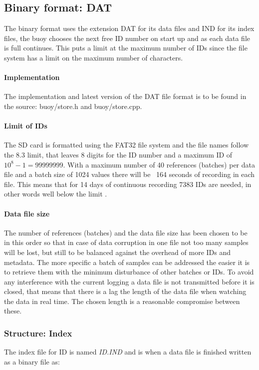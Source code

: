 \documentclass[a4paper]{article}
\begin{document}
\begin{multicols}{2}
  \subsection{Binary format: DAT}
  The binary format uses the extension DAT for its data files and IND
  for its index files, the buoy chooses the next free ID number on start
  up and as each data file is full continues. This puts a limit at the
  maximum number of IDs since the file system has a limit on the maximum
  number of characters.

  \paragraph{Implementation}
  The implementation and latest version of the DAT file format is to be
  found in the source: buoy/store.h and buoy/store.cpp.

  \paragraph{Limit of IDs}
  The SD card is formatted using the FAT32 file system and the file
  names follow the 8.3 limit, that leaves 8 digits for the ID number and
  a maximum ID of $10^8 - 1 = 99999999$. With a maximum number of 40 references
  (batches) per data file and a batch size of 1024 values there will be
  ~164 seconds of recording in each file. This means that for 14 days of
  continuous recording 7383 IDs are needed, in other words well below
  the limit \cite{local_data_capacity_budget}.

  \paragraph{Data file size}
  The number of references (batches) and the data file size has been
  chosen to be in this order so that in case of data corruption in one
  file not too many samples will be lost, but still to be balanced
  against the overhead of more IDs and metadata. The more specific a
  batch of samples can be addressed the easier it is to retrieve them
  with the minimum disturbance of other batches or IDs. To avoid any
  interference with the current logging a data file is not transmitted
  before it is closed, that means that there is a lag the length of the
  data file when watching the data in real time. The chosen length is a
  reasonable compromise between these.


  \subsubsection{Structure: Index}
  The index file for ID is named \textit{ID.IND} and is when a data file
  is finished written as a binary file as:
  \vspace{1em}


\end{multicols}
\end{document}
